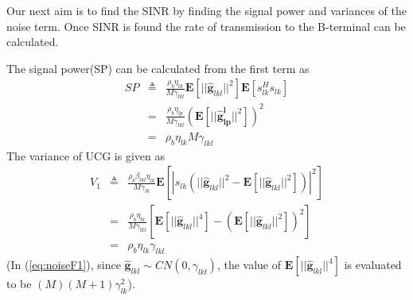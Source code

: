 \documentclass[10pt, a4paper, twoside,fleqn]{article}
\begin{document}
Our next aim is to find the SINR by finding the signal power and variances of the noise term. Once SINR is found the rate of transmission to the B-terminal can be calculated.

The signal power(SP) can be calculated from the first term as
\begin{eqnarray}
	SP &\triangleq& \frac{\rho_b\eta_{lk}}{M\gamma_{lkl}}\pmb{E}[||\pmb{\hat  g}_{lkl}||^2]\pmb{E}[s_{lk}^Hs_{lk}] \nonumber \\
            &=& \frac{\rho_b\eta_{lp}}{M\gamma_{lkl}}(\pmb{E}[||\pmb{\hat g_{lp}^{l}}||^2])^2 \nonumber \\
            &=& \rho_b\eta_{lk}M\gamma_{lkl}
\end{eqnarray}
The variance of UCG is given as
\begin{eqnarray}\label{eq:noiseF1}
	V_1 &\triangleq& \frac{\rho_b \beta_{lkl} \eta_{lk}}{M\gamma_{lk}}   \pmb{E}[|s_{lk}\left(||\pmb{\hat g}_{lkl}||^2- \pmb{E}[||\pmb{\hat  g}_{lkl}||^2] \right)|^2] \nonumber \\
	    &=& \frac{\rho_b \eta_{lk}}{M\gamma_{lkl}}   \left[\pmb{E}[||\pmb{\hat g}_{lkl}||^4] - (\pmb{E}[||\pmb{\hat g}_{lkl}||^2])^2 \right] \nonumber  \\
	    &=& \rho_b\eta_{lk}\gamma_{lkl}
\end{eqnarray}
(In (\ref{eq:noiseF1}), since $\pmb{\hat g}_{lkl} \sim CN(0,\gamma_{lkl})$, the value of $\pmb{E}[||\pmb{\hat g}_{lkl}||^4]$ is evaluated to be $(M)(M+1)\gamma_{lk}^2$).
\end{document}
